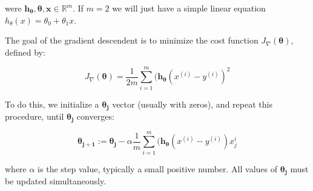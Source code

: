 were $\boldsymbol{h_{\theta}}, \boldsymbol{\theta}, \boldsymbol{x} \in \mathbb{R}^{m}$. If $m = 2$ we will just have a simple linear equation $h_{\theta}(x) = \theta_{0} + \theta_{1}x$.

The goal of the gradient descendent is to minimize the cost function $J_\nabla(\boldsymbol{\theta})$, defined by:

\begin{equation}
	J_\nabla(\boldsymbol{\theta}) = \frac{1}{2m} \sum_{i = 1}^{m}  ( \boldsymbol{h_{\theta}}(x^{(i)} - y^{(i)} )^{2}
\end{equation}


To do this, we initialize a $\boldsymbol{\theta_{j}}$ vector (usually with zeros), and repeat this procedure, until $\boldsymbol{\theta_{j}}$ converges:

\begin{equation}
	\boldsymbol{\theta_{j + 1}} := \boldsymbol{\theta_{j}} - \alpha \frac{1}{m} \sum_{i = 1}^{m}  ( \boldsymbol{h_{\theta}}(x^{(i)} - y^{(i)} )x_{j}^{i}
\end{equation}

where $\alpha$ is the step value, typically a small positive number. All values of $\boldsymbol{\theta_{j}}$ must be updated simultaneously\cite{web-coursera}. 


